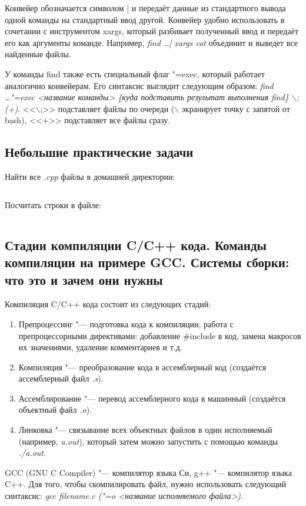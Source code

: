 \documentclass[12pt]{article}
\begin{document}
Конвейер обозначается символом | и передаёт данные из стандартного вывода одной команды на стандартный ввод другой. Конвейер удобно использовать в сочетании с инструментом xargs, который разбивает полученный ввод и передаёт его как аргументы команде. Например, \textit{find \dots | xargs cat} объединит и выведет все найденные файлы.

У команды find также есть специальный флаг "=exec, который работает аналогично конвейерам. Его синтаксис выглядит следующим образом: \textit{find \dots "=exec <название команды> \{куда подставить результат выполнения find\} $\backslash$; (+)}. <<$\backslash$;>> подставляет файлы по очереди ($\backslash$ экранирует точку с запятой от bash), <<+>> подставляет все файлы сразу.

\subsection{Небольшие практические задачи}
Найти все \textit{.cpp} файлы в домашней директории:
\inputminted{bash}{exam-findcpp.sh}

Посчитать строки в файле:
\inputminted{bash}{exam-countlines.sh}

\subsection{Стадии компиляции C/C++ кода. Команды компиляции на примере GCC. Системы сборки: что это и зачем они нужны}
Компиляция C/C++ кода состоит из следующих стадий:
\begin{enumerate}
\item Препроцессинг "--- подготовка кода к компиляции, работа с препроцессорными директивами: добавление \#include в код, замена макросов их значениями, удаление комментариев и т.д.
\item Компиляция "--- преобразование кода в ассемблерный код (создаётся ассемблерный файл \textit{.s}).
\item Ассемблирование "--- перевод ассемблерного кода в машинный (создаётся объектный файл \textit{.o}).
\item Линковка "--- связывание всех объектных файлов в один исполняемый (например, \textit{a.out}), который затем можно запустить с помощью команды \textit{./a.out}.
\end{enumerate}

GCC (GNU C Compiler) "--- компилятор языка Си, g++ "--- компилятор языка C++. Для того, чтобы скомпилировать файл, нужно использовать следующий синтаксис: \textit{gcc filename.c ("=o <название исполняемого файла>)}.
\end{document}
